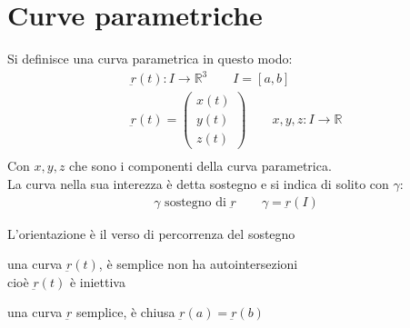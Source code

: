\documentclass[a4paper, oneside]{article}
\begin{document}
\section{Curve parametriche}
\begin{definition}
    Si definisce una curva parametrica in questo modo:
    \begin{gather*}
        \underbar{r}(t) : I \to \mathbb{R}^3 \qquad I = [a,b]\\
        \underbar{r}(t) = \begin{pmatrix}
            x(t)\\ y(t) \\ z(t)
        \end{pmatrix}
        \qquad x,y,z : I \to \mathbb{R}\\
    \end{gather*}
    Con $x,y,z$ che sono i componenti della curva parametrica.\\
    La curva nella sua interezza è detta sostegno e si indica di solito con $\gamma$:
    \begin{gather*}
        \gamma \text{ sostegno di } \underbar{r} \qquad \gamma = \underbar{r}(I)
    \end{gather*}
\end{definition}


\begin{definition}
    L'orientazione è il verso di percorrenza del sostegno
\end{definition}


\begin{definition}
    una curva $\underbar{r}(t)$, è semplice  non ha autointersezioni\\
    cioè  $\underbar{r}(t)$ è iniettiva
\end{definition}


\begin{definition}
    una curva $\underbar{r}$ semplice, è chiusa  $\underbar{r}(a) = \underbar{r}(b)$
\end{definition}
\end{document}
